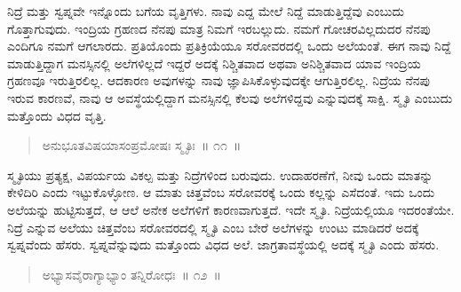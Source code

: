 ನಿದ್ರೆ ಮತ್ತು ಸ್ವಪ್ನವೇ ಇನ್ನೊಂದು ಬಗೆಯ ವೃತ್ತಿಗಳು. ನಾವು ಎದ್ದ ಮೇಲೆ ನಿದ್ದೆ ಮಾಡುತ್ತಿದ್ದೆವು ಎಂಬುದು ಗೊತ್ತಾಗುವುದು. ಇಂದ್ರಿಯ ಗ್ರಹಣದ ನೆನಪು ಮಾತ್ರ ನಿಮಗೆ ಇರಬಲ್ಲುದು. ನಮಗೆ ಗೋಚರವಿಲ್ಲದುದರ ನೆನಪು ಎಂದಿಗೂ ನಮಗೆ ಆಗಲಾರದು. ಪ್ರತಿಯೊಂದು ಪ್ರತಿಕ್ರಿಯೆಯೂ ಸರೋವರದಲ್ಲಿ ಒಂದು ಅಲೆಯಂತೆ. ಈಗ ನಾವು ನಿದ್ದೆ ಮಾಡುತ್ತಿದ್ದಾಗ ಮನಸ್ಸಿನಲ್ಲಿ ಅಲೆಗಳಿಲ್ಲದೆ ಇದ್ದರೆ ಅದಕ್ಕೆ ನಿಶ್ಚಿತವಾದ ಅಥವಾ ಅನಿಶ್ಚಿತವಾದ ಯಾವ ಇಂದ್ರಿಯ ಗ್ರಹಣವೂ ಇರುತ್ತಿರಲಿಲ್ಲ. ಆದಕಾರಣ ಅವುಗಳನ್ನು ನಾವು ಜ್ಞಾಪಿಸಿಕೊಳ್ಳುವುದಕ್ಕೇ ಆಗುತ್ತಿರಲಿಲ್ಲ. ನಿದ್ರೆಯ ನೆನಪು ಇರುವ ಕಾರಣವೆ, ನಾವು ಆ ಅವಸ್ಥೆಯಲ್ಲಿದ್ದಾಗ ಮನಸ್ಸಿನಲ್ಲಿ ಕೆಲವು ಅಲೆಗಳಿದ್ದವು ಎನ್ನುವುದಕ್ಕೆ ಸಾಕ್ಷಿ. ಸ್ಮೃತಿ ಎಂಬುದು ಮತ್ತೊಂದು ವಿಧದ ವೃತ್ತಿ. 

\vspace{-0.2cm}

\begin{verse}
ಅನುಭೂತವಿಷಯಾಸಂಪ್ರಮೋಷಃ ಸ್ಮೃತಿಃ~॥ ೧೧~॥
\end{verse}

\vspace{-0.4cm}


\vspace{0.1cm}

ಸ್ಮೃತಿಯು ಪ್ರತ್ಯಕ್ಷ, ವಿಪರ್ಯಯ ವಿಕಲ್ಪ ಮತ್ತು ನಿದ್ರೆಗಳಿಂದ ಬರುವುದು. ಉದಾಹರಣೆಗೆ, ನೀವು ಒಂದು ಮಾತನ್ನು ಕೇಳಿದಿರಿ ಎಂದು ಇಟ್ಟುಕೊಳ್ಳೋಣ. ಆ ಮಾತು ಚಿತ್ತವೆಂಬ ಸರೋವರಕ್ಕೆ ಒಂದು ಕಲ್ಲನ್ನು ಎಸೆದಂತೆ. ಇದು ಒಂದು ಅಲೆಯನ್ನು ಹುಟ್ಟಿಸುತ್ತದೆ, ಆ ಆಲೆ ಅನೇಕ ಅಲೆಗಳಿಗೆ ಕಾರಣವಾಗುತ್ತದೆ. ಇದೇ ಸ್ಮೃತಿ. ನಿದ್ರೆಯಲ್ಲಿಯೂ ಇದರಂತೆಯೇ. ನಿದ್ರೆ ಎನ್ನುವ ಅಲೆಯು ಚಿತ್ತವೆಂಬ ಸರೋವರದಲ್ಲಿ ಸ್ಮೃತಿ ಎಂಬ ಬೇರೆ ಅಲೆಗಳನ್ನು ಉಂಟು ಮಾಡಿದರೆ ಅದಕ್ಕೆ ಸ್ವಪ್ನವೆಂದು ಹೆಸರು. ಸ್ವಪ್ನವೆನ್ನುವುದು ಮತ್ತೊಂದು ವಿಧದ ಅಲೆ. ಜಾಗ್ರತಾವಸ್ಥೆಯಲ್ಲಿ ಅದಕ್ಕೆ ಸ್ಮೃತಿ ಎಂದು ಹೆಸರು. 

\vspace{-0.2cm}

\begin{verse}
ಅಭ್ಯಾಸವೈರಾಗ್ಯಾಭ್ಯಾಂ ತನ್ನಿರೋಧಃ~॥ ೧೨~॥
\end{verse}

\vspace{-0.3cm}


\vspace{0.1cm}

